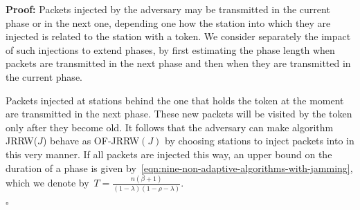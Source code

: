 \documentclass[11pt]{article}
\newcommand{\qed}{\hfill $\square$}
\newenvironment{proof}{\noindent\textbf{Proof: }}{\qed \smallbreak}
\begin{document}
\begin{proof}
Packets injected by the adversary may be transmitted in the current phase or in the next one, depending one how the station into which they are injected is related to the station with a token.
We consider separately the impact of such injections to extend phases, by first estimating the phase length when packets are transmitted in the next phase and then when they are transmitted in the current phase.


Packets injected at stations behind the one that holds the token at the moment are transmitted in the next phase.
These new packets will be visited by the token only after they become old.
It follows that the adversary can make algorithm \textsc{JRRW}($J$) behave as \textsc{OF-JRRW$(J)$} by  choosing stations to inject packets into in this very manner.
If all packets are injected this way, an upper bound on the duration of a phase is given by~\eqref{eqn:nine-non-adaptive-algorithms-with-jamming}, which we denote by~$T=\frac{n(\beta+1)}{(1-\lambda)(1-\rho-\lambda)}$.


\end{proof}
\end{document}
